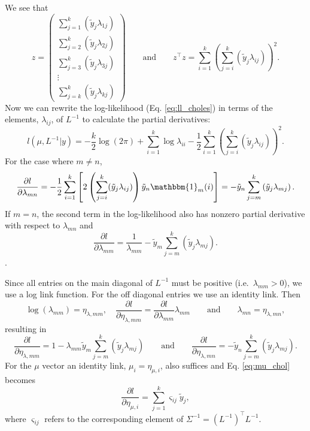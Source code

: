 \documentclass{article}
\begin{document}
%
We see that 
%
\begin{equation}
	z =
  \begin{pmatrix}
    \sum_{j=1}^k (\tilde{y}_j \lambda_{1j}) \\
    \sum_{j=2}^k (\tilde{y}_j \lambda_{2j}) \\
    \sum_{j=3}^k (\tilde{y}_j \lambda_{3j}) \\
    \vdots \\
    \sum_{j=k}^k (\tilde{y}_j \lambda_{kj}) 
  \end{pmatrix}
  \qquad \text{and} \qquad
  z^\top z =
	\sum_{i=1}^k \left( \sum_{j=i}^k \left( \tilde{y}_j \lambda_{ij} \right) \right)^2.
\end{equation}
%
Now we can rewrite the log-likelihood (Eq. \ref{eq:ll_choles}) in terms of the 
elements, $\lambda_{ij}$, of $L^{-1}$ to calculate the partial derivatives:
%
\begin{equation}
	l(\mu, L^{-1}|y) = -\frac{k}{2}\log(2\pi) + \sum_{i=1}^k 
	\log{\lambda_{ii}} - \frac{1}{2} \sum_{i=1}^k 
	\left( \sum_{j=i}^k \left( \tilde{y}_j \lambda_{ij} 
	\right) \right)^2.
 \label{eq:ll_chol_terms}
\end{equation}
%
For the case where $m \neq n$, 
%
\begin{equation}
  \frac{\partial l}{\partial \lambda_{mn}} = 
  -\frac{1}{2} \sum_{i=1}^k \left[2 \left(\sum_{j=i}^k (\tilde{y}_j \lambda_{ij}) 
	\right) \tilde{y}_n \mathbbm{1}_m(i) \right] = 
  - \tilde{y}_n \sum_{j = m}^{k} \left( \tilde{y}_j \lambda_{mj} \right).	
\end{equation}
%
If $m = n$, the second term in the log-likelihood also has nonzero partial 
derivative with respect to $\lambda_{mn}$ and
%
\begin{equation}
  \frac{\partial l}{\partial \lambda_{mm}} = 
	\frac{1}{\lambda_{mm}}- \tilde{y}_m \sum_{j = m}^{k} 
	\left( \tilde{y}_j \lambda_{mj} \right).	
\end{equation}.

Since all entries on the main diagonal of $L^{-1}$ must be positive 
(i.e.\ $\lambda_{mm} > 0$), we use a log link function. For the 
off diagonal entries we use an identity link. Then
%
\begin{equation}
	\log(\lambda_{mm}) = \eta_{\lambda,mm}, \quad
        \frac{\partial l}{\partial \eta_{\lambda,mm}} =
	\frac{\partial l}{\partial \lambda_{mm}} \lambda_{mm}
	\qquad \text{and} \qquad  
        \lambda_{mn} = \eta_{\lambda,mn},
\end{equation}
%
resulting in 
%
\begin{equation}
  \frac{\partial l}{\partial \eta_{\lambda,mm}} =
  1 - \lambda_{mm} \tilde{y}_m \sum_{j=m}^k (\tilde{y}_j \lambda_{mj})
  \qquad \text{and} \qquad
  \frac{\partial l}{\partial \eta_{\lambda,mn}} = 
	- \tilde{y}_n \sum_{j = m}^{k} \left( \tilde{y}_j \lambda_{mj} \right).
\end{equation}
%
For the $\mu$ vector an identity link, 
$\mu_i = \eta_{\mu,i}$, also suffices and Eq. \ref{eq:mu_chol} becomes
%
\begin{equation}
  \frac{\partial l}{\partial \eta_{\mu, i}} = 
	\sum_{j=1}^k \varsigma_{ij} \tilde{y}_j, 
\end{equation}
%
where $\varsigma_{ij}$ refers to the corresponding element of 
$\Sigma^{-1} = (L^{-1})^\top L^{-1}$.
\end{document}
